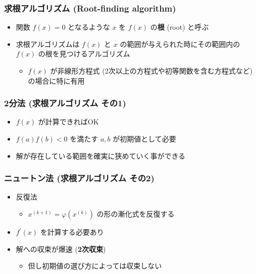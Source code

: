 \documentclass[dvipdfmx,aspectratio=169,20pt]{beamer}
\begin{document}
\date[\todey]{}

\frame{\titlepage}

\begin{frame}
\frametitle{求根アルゴリズム {\small (Root-finding algorithm)}}
\begin{itemize}
    \setlength{\itemsep}{0.5cm}
    \item 関数 $f(x)=0$ となるような $x$ を $f(x)$ の{\bf 根} (root) と呼ぶ
    \item 求根アルゴリズムは $f(x)$ と $x$ の範囲が与えられた時にその範囲内の $f(x)$ の根を見つけるアルゴリズム
    \begin{itemize}
        \item $f(x)$ が非線形方程式 (2次以上の方程式や初等関数を含む方程式など) の場合に特に有用
    \end{itemize}
\end{itemize}
\end{frame}
\begin{frame}
\frametitle{2分法 {\normalsize (求根アルゴリズム その1)}}
\begin{itemize}
    \item $f(x)$ が計算できればOK
    \item $f(a)f(b)<0$ を満たす $a,b$ が初期値として必要
    \item 解が存在している範囲を確実に狭めていく事ができる
\end{itemize}
\end{frame}
\begin{frame}
\frametitle{ニュートン法 {\normalsize (求根アルゴリズム その2)}}
\begin{itemize}
    \item 反復法
    \begin{itemize}
        \item $x^{(k+1)}=\varphi(x^{(k)})$ の形の漸化式を反復する
    \end{itemize}
    \item $f^{\prime}(x)$ を計算する必要あり 
    \item 解への収束が爆速 ({\bf 2次収束})
    \begin{itemize}
        \item 但し初期値の選び方によっては収束しない
    \end{itemize}
\end{itemize}
\end{frame}
\end{document}
